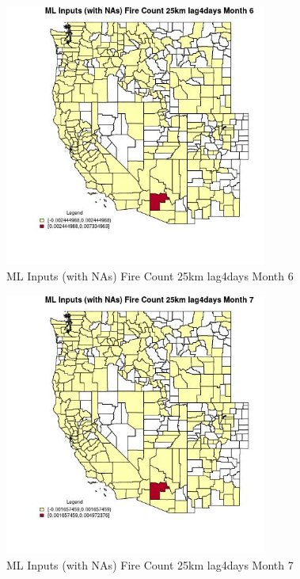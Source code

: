 \begin{figure} 
\centering  
\includegraphics[width=0.77\textwidth]{Code_Outputs/Report_ML_input_PM25_Step4_part_e_de_duplicated_aves_compiled_2019-05-20wNAs_CountyFire_Count_25km_lag4daysmedianMonth6.jpg} 
\caption{\label{fig:Report_ML_input_PM25_Step4_part_e_de_duplicated_aves_compiled_2019-05-20wNAsCountyFire_Count_25km_lag4daysmedianMonth6}ML Inputs (with NAs) Fire Count 25km lag4days Month 6} 
\end{figure} 
 

\begin{figure} 
\centering  
\includegraphics[width=0.77\textwidth]{Code_Outputs/Report_ML_input_PM25_Step4_part_e_de_duplicated_aves_compiled_2019-05-20wNAs_CountyFire_Count_25km_lag4daysmedianMonth7.jpg} 
\caption{\label{fig:Report_ML_input_PM25_Step4_part_e_de_duplicated_aves_compiled_2019-05-20wNAsCountyFire_Count_25km_lag4daysmedianMonth7}ML Inputs (with NAs) Fire Count 25km lag4days Month 7} 
\end{figure} 
 

